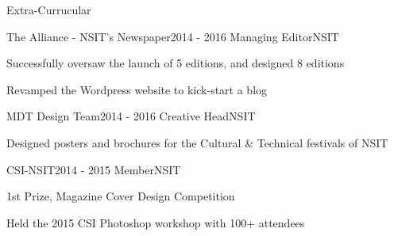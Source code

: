 \documentclass{resume} %
\begin{document}


\begin{rSection}{Extra-Currucular} \itemsep -3pt

    \begin{rSubsection}{The Alliance - NSIT's Newspaper}{2014 - 2016}
        {Managing Editor}{NSIT}
        
        \item Successfully oversaw the launch of 5 editions, and designed 8 editions
        \item Revamped the Wordpress website to kick-start a blog
    \end{rSubsection}


    \begin{rSubsection}{MDT Design Team}{2014 - 2016}
        {Creative Head}{NSIT}
        \item Designed posters and brochures for the Cultural \& Technical festivals of NSIT
    \end{rSubsection}

    \begin{rSubsection}{CSI-NSIT}{2014 - 2015}
        {Member}{NSIT}
        \item 1st Prize, Magazine Cover Design Competition
        \item Held the 2015 CSI Photoshop workshop with 100+ attendees
    \end{rSubsection}

\end{rSection}
\end{document}
